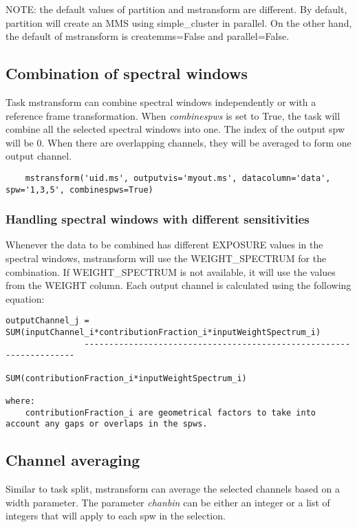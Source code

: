 NOTE: the default values of partition and mstransform are different.
By default, partition will create an MMS using simple_cluster in parallel.
On the other hand, the default of mstransform is createmms=False and
parallel=False.

\subsection{Combination of spectral windows}
Task mstransform can combine spectral windows independently or
with a reference frame transformation. When {\it combinespws} is set to True, the task will
combine all the selected spectral windows into one. The index of the output spw
will be 0. When there are overlapping channels, they will be averaged to form one
output channel.

\begin{verbatim}
    mstransform('uid.ms', outputvis='myout.ms', datacolumn='data', spw='1,3,5', combinespws=True)
\end{verbatim}

\subsubsection{Handling spectral windows with different sensitivities}
Whenever the data to be combined has different EXPOSURE values in the spectral
windows, mstransform will use the WEIGHT\_SPECTRUM for the combination. If
WEIGHT\_SPECTRUM is not available, it will use the values from the WEIGHT
column. Each output channel is calculated using the following equation:

\begin{verbatim}
outputChannel_j = SUM(inputChannel_i*contributionFraction_i*inputWeightSpectrum_i) 
                --------------------------------------------------------------------
                        SUM(contributionFraction_i*inputWeightSpectrum_i)

where:
    contributionFraction_i are geometrical factors to take into account any gaps or overlaps in the spws.
\end{verbatim}

\subsection{Channel averaging}
Similar to task split, mstransform can average the selected channels based on a
width parameter. The parameter {\it chanbin} can be either an integer or a list of
integers that will apply to each spw in the selection.


